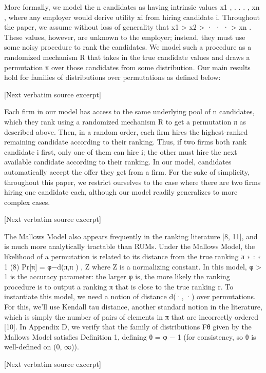 \documentclass[10pt]{article}
\begin{document}
\begin{ReviewVerbatim}
More formally, we model the n candidates as having intrinsic values x1 , . . . , xn , where any employer would
derive utility xi from hiring candidate i. Throughout the paper, we assume without loss of generality that
x1 > x2 > · · · > xn . These values, however, are unknown to the employer; instead, they must use some
noisy procedure to rank the candidates. We model such a procedure as a randomized mechanism R that
takes in the true candidate values and draws a permutation π over those candidates from some distribution.
Our main results hold for families of distributions over permutations as defined below:

[Next verbatim source excerpt]

Each firm in our model has access to the same underlying pool of n candidates, which they rank using
a randomized mechanism R to get a permutation π as described above. Then, in a random order, each
firm hires the highest-ranked remaining candidate according to their ranking. Thus, if two firms both rank
candidate i first, only one of them can hire i; the other must hire the next available candidate according to
their ranking. In our model, candidates automatically accept the offer they get from a firm. For the sake
of simplicity, throughout this paper, we restrict ourselves to the case where there are two firms hiring one
candidate each, although our model readily generalizes to more complex cases.

[Next verbatim source excerpt]

The Mallows Model also appears frequently in the ranking literature [8, 11], and is much more analytically
tractable than RUMs. Under the Mallows Model, the likelihood of a permutation is related to its distance
from the true ranking π ∗ :
∗
1
(8)
Pr[π] = φ−d(π,π ) ,
Z
where Z is a normalizing constant. In this model, φ > 1 is the accuracy parameter: the larger φ is, the
more likely the ranking procedure is to output a ranking π that is close to the true ranking r. To instantiate
this model, we need a notion of distance d(·, ·) over permutations. For this, we’ll use Kendall tau distance,
another standard notion in the literature, which is simply the number of pairs of elements in π that are
incorrectly ordered [10]. In Appendix D, we verify that the family of distributions Fθ given by the Mallows
Model satisfies Definition 1, defining θ = φ − 1 (for consistency, so θ is well-defined on (0, ∞)).

[Next verbatim source excerpt]


\end{ReviewVerbatim}
\end{document}
